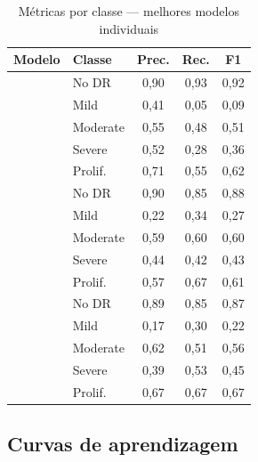\documentclass[conference]{IEEEtran}
\begin{document}
\begin{table}[htbp]
\caption{M\'etricas por classe --- melhores modelos individuais}
\label{tab:metricas_classe}
\centering
\scriptsize
\setlength{\tabcolsep}{3.5pt}
\begin{tabular}{l l c c c}
\hline
\textbf{Modelo} & \textbf{Classe} & \textbf{Prec.} & \textbf{Rec.} & \textbf{F1} \\
\hline
{}
  & No DR    & 0,90 & 0,93 & 0,92 \\
  & Mild     & 0,41 & 0,05 & 0,09 \\
  & Moderate & 0,55 & 0,48 & 0,51 \\
  & Severe   & 0,52 & 0,28 & 0,36 \\
  & Prolif.  & 0,71 & 0,55 & 0,62 \\
\hline
{}
  & No DR    & 0,90 & 0,85 & 0,88 \\
  & Mild     & 0,22 & 0,34 & 0,27 \\
  & Moderate & 0,59 & 0,60 & 0,60 \\
  & Severe   & 0,44 & 0,42 & 0,43 \\
  & Prolif.  & 0,57 & 0,67 & 0,61 \\
\hline
{}
  & No DR    & 0,89 & 0,85 & 0,87 \\
  & Mild     & 0,17 & 0,30 & 0,22 \\
  & Moderate & 0,62 & 0,51 & 0,56 \\
  & Severe   & 0,39 & 0,53 & 0,45 \\
  & Prolif.  & 0,67 & 0,67 & 0,67 \\
\hline
\end{tabular}
\end{table}

\subsection{Curvas de aprendizagem}

\end{document}
